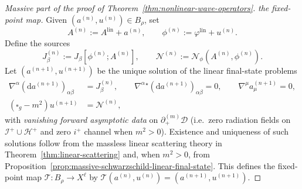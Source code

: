 \documentclass[11pt]{article}
\numberwithin{equation}{section}
\theoremstyle{plain}
\theoremstyle{definition}
\theoremstyle{remark}
\newcommand{\D}{\mathcal{D}}
\newcommand{\dd}{\mathrm{d}}
\begin{document}
\begin{proof}[Massive part of the proof of Theorem~\ref{thm:nonlinear-wave-operators}]
\medskip
\noindent\textit{the fixed-point map.}
Given $(a^{(n)},u^{(n)})\in B_\rho$, set
\begin{equation}
A^{(n)}:=A^{\mathrm{lin}}+a^{(n)},
\qquad
\phi^{(n)}:=\varphi^{\mathrm{lin}}+u^{(n)}.
\end{equation}
Define the sources
\begin{equation}
J^{(n)}_\beta:=J_\beta[\phi^{(n)};A^{(n)}],
\qquad
\mathcal N^{(n)}:=\mathcal N_\phi(A^{(n)},\phi^{(n)}).
\end{equation}
Let $(a^{(n+1)},u^{(n+1)})$ be the unique solution of the linear final-state problems
\begin{eqnarray}
\nabla^\alpha (\dd a^{(n+1)})_{\alpha\beta}&=J^{(n)}_\beta,
\qquad
\nabla^\alpha{}^\star(\dd a^{(n+1)})_{\alpha\beta}=0,
\qquad
\nabla^\mu a^{(n+1)}_\mu=0,
\label{eq:iter-maxwell}
\\
(\square_g-m^{2})u^{(n+1)}&=\mathcal N^{(n)},
\label{eq:iter-kg}
\end{eqnarray}
with \emph{vanishing forward asymptotic data} on $\partial_{+}^{(m)}\D$ (i.e.\ zero radiation fields on $\mathcal I^{+}\cup\mathcal H^{+}$ and zero $i^{+}$ channel when $m^{2}>0$).
Existence and uniqueness of such solutions follow from the massless linear scattering theory in Theorem~\ref{thm:linear-scattering} and, when $m^2>0$, from Proposition~\ref{prop:massive-schwarzschild-linear-final-state}.
This defines the fixed-point map $\mathcal T:B_\rho\to X^{\ell}$ by $\mathcal T(a^{(n)},u^{(n)})=(a^{(n+1)},u^{(n+1)})$.


\end{proof}
\end{document}
